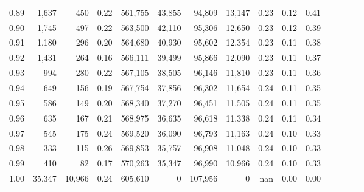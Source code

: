 \begin{tabular}{rrrcrrrrrrrrrrr}
0.89 &   1,637 &     450 &                                       0.22 &  561,755 &   43,855 &   94,809 &  13,147 &  0.23 &  0.12 &                         0.41 \\
0.90 &   1,745 &     497 &                                       0.22 &  563,500 &   42,110 &   95,306 &  12,650 &  0.23 &  0.12 &                         0.39 \\
0.91 &   1,180 &     296 &                                       0.20 &  564,680 &   40,930 &   95,602 &  12,354 &  0.23 &  0.11 &                         0.38 \\
0.92 &   1,431 &     264 &                                       0.16 &  566,111 &   39,499 &   95,866 &  12,090 &  0.23 &  0.11 &                         0.37 \\
0.93 &     994 &     280 &                                       0.22 &  567,105 &   38,505 &   96,146 &  11,810 &  0.23 &  0.11 &                         0.36 \\
0.94 &     649 &     156 &                                       0.19 &  567,754 &   37,856 &   96,302 &  11,654 &  0.24 &  0.11 &                         0.35 \\
0.95 &     586 &     149 &                                       0.20 &  568,340 &   37,270 &   96,451 &  11,505 &  0.24 &  0.11 &                         0.35 \\
0.96 &     635 &     167 &                                       0.21 &  568,975 &   36,635 &   96,618 &  11,338 &  0.24 &  0.11 &                         0.34 \\
0.97 &     545 &     175 &                                       0.24 &  569,520 &   36,090 &   96,793 &  11,163 &  0.24 &  0.10 &                         0.33 \\
0.98 &     333 &     115 &                                       0.26 &  569,853 &   35,757 &   96,908 &  11,048 &  0.24 &  0.10 &                         0.33 \\
0.99 &     410 &      82 &                                       0.17 &  570,263 &   35,347 &   96,990 &  10,966 &  0.24 &  0.10 &                         0.33 \\
1.00 &  35,347 &  10,966 &                                       0.24 &  605,610 &        0 &  107,956 &       0 &   nan &  0.00 &                         0.00 \\
\bottomrule
\end{tabular}
